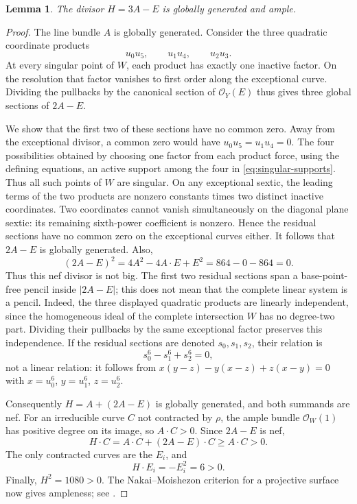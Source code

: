 \documentclass[11pt,reqno]{amsart}
\numberwithin{equation}{section}
\newtheorem{lemma}[theorem]{Lemma}
\theoremstyle{definition}
\theoremstyle{remark}
\newcommand{\OO}{\mathcal O}
\begin{document}
\begin{lemma}\label{lem:polarization}
The divisor $H=3A-E$ is globally generated and ample.
\end{lemma}

\begin{proof}
The line bundle $A$ is globally generated. Consider the three quadratic
coordinate products
\[
 u_0u_5,\qquad u_1u_4,\qquad u_2u_3.
\]
At every singular point of $W$, each product has exactly one inactive
factor. On the resolution that factor vanishes to first order along
the exceptional curve. Dividing the pullbacks by the canonical section
of $\OO_Y(E)$ thus gives three global sections of $2A-E$.

We show that the first two of these sections have no common zero.
Away from the exceptional divisor, a common zero would have
$u_0u_5=u_1u_4=0$. The four possibilities obtained by choosing one
factor from each product force, using the defining equations, an
active support among the four in \eqref{eq:singular-supports}.
Thus all such points of $W$ are singular.
On any exceptional sextic, the leading terms of the two products
are nonzero constants times two distinct inactive coordinates.
Two coordinates cannot vanish simultaneously on the diagonal plane
sextic: its remaining sixth-power coefficient is nonzero. Hence the
residual sections have no common zero on the exceptional curves either.
It follows that $2A-E$ is globally generated. Also,
\[
 (2A-E)^2=4A^2-4A\cdot E+E^2=864-0-864=0.
\]
Thus this nef divisor is not big. The first two residual sections span
a base-point-free pencil inside $|2A-E|$; this does not mean that the
complete linear system is a pencil. Indeed, the three displayed
quadratic products are linearly independent, since the homogeneous
ideal of the complete intersection $W$ has no degree-two part.
Dividing their pullbacks by the same exceptional factor preserves this
independence. If the residual sections are denoted $s_0,s_1,s_2$, their
relation is
\[
 s_0^6-s_1^6+s_2^6=0,
\]
not a linear relation: it follows from
$x(y-z)-y(x-z)+z(x-y)=0$ with
$x=u_0^6$, $y=u_1^6$, $z=u_2^6$.

Consequently $H=A+(2A-E)$ is globally generated, and both summands are
nef. For an irreducible curve $C$ not contracted by $\rho$, the ample
bundle $\OO_W(1)$ has positive degree on its image, so $A\cdot C>0$.
Since $2A-E$ is nef,
\[
 H\cdot C=A\cdot C+(2A-E)\cdot C\geq A\cdot C>0.
\]
The only contracted curves are the $E_i$, and
\[
 H\cdot E_i=-E_i^2=6>0.
\]
Finally, $H^2=1080>0$. The Nakai--Moishezon criterion for a projective
surface now gives ampleness; see \cite[Chapter V, Theorem 1.10]{Hartshorne1977}.
\end{proof}
\end{document}

